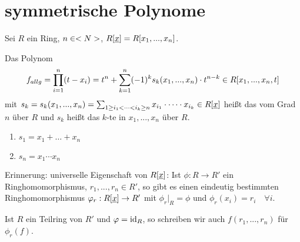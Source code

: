 \section{symmetrische Polynome}

Sei $R$ ein Ring, $n\in<N>$, $R[\uline{x}]=R[x_1,...,x_n]$.

\begin{definition}
	Das Polynom
	\begin{align}
		f_{allg} = \prod_{i=1}^{n} (t-x_i) = t^n + \sum_{k=1}^{n} (-1)^k s_k(x_1,...,x_n)\cdot t^{n-k}\in R[x_1,...,x_n,t] \notag
	\end{align}
	mit $s_k = s_k(x_1,...,x_n) = \sum_{1\ge i_1<\dots< i_k\ge n} x_{i_1}\cdot \dots\cdot x_{i_k}\in R[\uline{x}]$ heißt das  vom Grad $n$ über $R$ und $s_k$ heißt das $k$-te  in $x_1,...,x_n$ über $R$.
\end{definition}

\begin{example}
	\begin{enumerate}[label=(\alph*)]
		\item $s_1 = x_1+\dots +x_n$
		\item $s_n = x_1\cdots x_n$
	\end{enumerate}
\end{example}

\begin{remark}
	Erinnerung: universelle Eigenschaft von $R[\uline{x}]$: Ist $\phi: R\to R'$ ein Ringhomomorphismus, $r_1,...,r_n\in R'$, so gibt es einen eindeutig bestimmten Ringhomomorphismus $\phi_r:R[\uline{x}]\to R'$ mit $\phi_r\vert_R=\phi$ und $\phi_r(x_i)=r_i\quad\forall i$.
	
	Ist $R$ ein Teilring von $R'$ und $\varphi=\operatorname{id}_R$, so schreiben wir auch $f(r_1,...,r_n)$ für $\phi_r(f)$.
\end{remark}